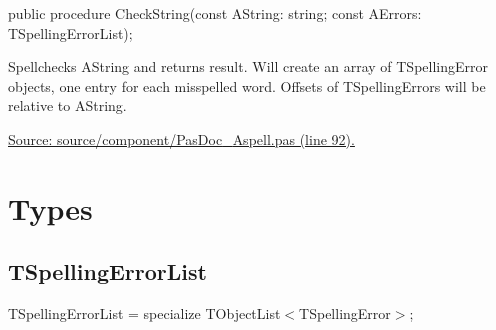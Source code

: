 \documentclass{report}
\newif\ifpdf
\begin{document}
\label{PasDoc_Aspell.TAspellProcess-CheckString}
\begin{list}{}{
\setlength{\itemindent}{0cm}
\setlength{\listparindent}{0cm}
\setlength{\leftmargin}{\evensidemargin}
\addtolength{\leftmargin}{\tmplength}
\settowidth{\labelsep}{X}
\addtolength{\leftmargin}{\labelsep}
\setlength{\labelwidth}{\tmplength}
}
\item[\textbf{Declaration}\hfill]
\ifpdf
\begin{flushleft}
\fi
\begin{ttfamily}
public procedure CheckString(const AString: string; const AErrors: TSpellingErrorList);\end{ttfamily}

\ifpdf
\end{flushleft}
\fi

\par
\item[\textbf{Description}]
Spellchecks AString and returns result. Will create an array of TSpellingError objects, one entry for each misspelled word. Offsets of TSpellingErrors will be relative to AString.\par
\href{https://github.com/pasdoc/pasdoc/blob/master/source/component/PasDoc_Aspell.pas#L92}{Source: source/component/PasDoc{\_}Aspell.pas (line 92).}

\end{list}
\section{Types}
\ifpdf
\subsection*{\large{\textbf{TSpellingErrorList}}\normalsize\hspace{1ex}\hrulefill}
\else
\subsection*{TSpellingErrorList}
\fi
\label{PasDoc_Aspell-TSpellingErrorList}
\begin{list}{}{
\setlength{\itemindent}{0cm}
\setlength{\listparindent}{0cm}
\setlength{\leftmargin}{\evensidemargin}
\addtolength{\leftmargin}{\tmplength}
\settowidth{\labelsep}{X}
\addtolength{\leftmargin}{\labelsep}
\setlength{\labelwidth}{\tmplength}
}
\item[\textbf{Declaration}\hfill]
\ifpdf
\begin{flushleft}
\fi
\begin{ttfamily}
TSpellingErrorList = specialize TObjectList{$<$}TSpellingError{$>$};\end{ttfamily}

\ifpdf
\end{flushleft}
\fi

\end{list}
\end{document}
